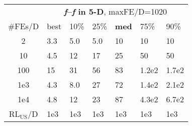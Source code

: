\begin{tabular}{c|llllll}
 & \multicolumn{6}{|c}{\textbf{\textit{f}\raisebox{-0.35ex}{1}--\textit{f}\raisebox{-0.35ex}{55} in 5-D}, maxFE/D=1020}\\
\#FEs/D & best & 10\% & 25\% & \textbf{med} & 75\% & 90\%\\
2 & \hspace*{1ex}3.3 & \hspace*{1ex}5.0 & \hspace*{1ex}5.0 & 10 & 10 & 10\\
10 & \hspace*{1ex}4.5 & 12 & 17 & 25 & 50 & 50\\
100 & 15 & 31 & 56 & 83 & 1.2e2 & 1.7e2\\
1e3 & \hspace*{1ex}4.3 & \hspace*{1ex}8.0 & 27 & 72 & 1.4e2 & 2.1e2\\
1e4 & \hspace*{1ex}4.8 & 12 & 23 & 87 & 4.3e2 & 6.7e2\\
$\text{RL}_{\text{US}}$/D & 1e3 & 1e3 & 1e3 & 1e3 & 1e3 & 1e3
\end{tabular}
